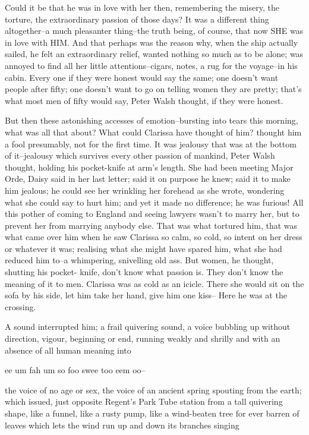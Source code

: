 \documentclass[lang=cn,10pt]{elegantbook}
\begin{document}
Could it be that he was in love with her then, remembering the
misery, the torture, the extraordinary passion of those days?  It
was a different thing altogether--a much pleasanter thing--the
truth being, of course, that now SHE was in love with HIM.  And
that perhaps was the reason why, when the ship actually sailed, he
felt an extraordinary relief, wanted nothing so much as to be
alone; was annoyed to find all her little attentions--cigars,
notes, a rug for the voyage--in his cabin.  Every one if they were
honest would say the same; one doesn't want people after fifty; one
doesn't want to go on telling women they are pretty; that's what
most men of fifty would say, Peter Walsh thought, if they were
honest.

But then these astonishing accesses of emotion--bursting into tears
this morning, what was all that about?  What could Clarissa have
thought of him? thought him a fool presumably, not for the first
time.  It was jealousy that was at the bottom of it--jealousy which
survives every other passion of mankind, Peter Walsh thought,
holding his pocket-knife at arm's length.  She had been meeting
Major Orde, Daisy said in her last letter; said it on purpose he
knew; said it to make him jealous; he could see her wrinkling her
forehead as she wrote, wondering what she could say to hurt him;
and yet it made no difference; he was furious!  All this pother of
coming to England and seeing lawyers wasn't to marry her, but to
prevent her from marrying anybody else.  That was what tortured
him, that was what came over him when he saw Clarissa so calm, so
cold, so intent on her dress or whatever it was; realising what she
might have spared him, what she had reduced him to--a whimpering,
snivelling old ass.  But women, he thought, shutting his pocket-
knife, don't know what passion is.  They don't know the meaning of
it to men.  Clarissa was as cold as an icicle.  There she would sit
on the sofa by his side, let him take her hand, give him one kiss--
Here he was at the crossing.

A sound interrupted him; a frail quivering sound, a voice bubbling
up without direction, vigour, beginning or end, running weakly and
shrilly and with an absence of all human meaning into


     ee um fah um so
     foo swee too eem oo--


the voice of no age or sex, the voice of an ancient spring spouting
from the earth; which issued, just opposite Regent's Park Tube
station from a tall quivering shape, like a funnel, like a rusty
pump, like a wind-beaten tree for ever barren of leaves which lets
the wind run up and down its branches singing
\end{document}
